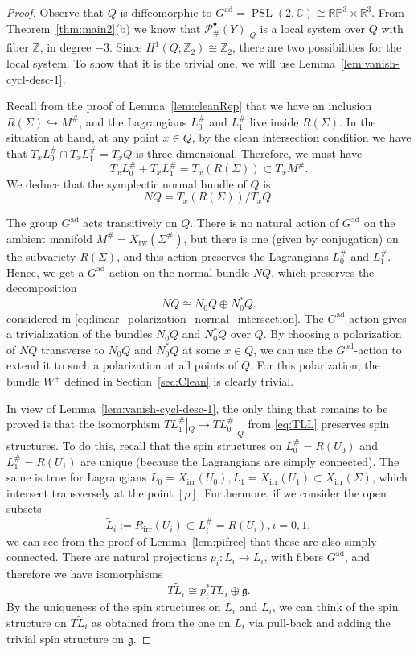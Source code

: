\documentclass [11pt]{amsart}
\theoremstyle{remark}
\def\zz {{\mathbb{Z}}}
\def\rr {{\mathbb{R}}}
\def\cc {{\mathbb{C}}}
\def\R{\rr}
\def\Z {\zz}
\def\rp {\mathbb{RP}}
\def\g{\mathfrak{g}}
\def\Gad{G^{\operatorname{ad}}}
\def\psl {{\operatorname{PSL}(2, \cc)}}
\def\Rep {R}
\def\RepIrr{R_{\operatorname{irr}}}
\def\Char {X}
\def\CharIrr {\Char_{\operatorname{irr}}}
\def\P {\mathcal{P}}
\def\Xtw{\Char_{\operatorname{tw}}}
\def\tL{\tilde{L}}
\begin{document}
\begin{proof}
Observe that $Q$ is diffeomorphic to $\Gad = \psl \cong \rp^3 \times \R^3$. From Theorem~\ref{thm:main2}(b) we know that $\P^{\bullet}_{\#}(Y)|_Q$ is a local system over $Q$ with fiber $\Z$, in degree $-3$. Since $H^1(Q; \Z_2) \cong \Z_2$, there are two possibilities for the local system. To show that it is the trivial one, we will use Lemma~\ref{lem:vanish-cycl-desc-1}.

Recall from the proof of Lemma~\ref{lem:cleanRep} that we have an inclusion $\Rep(\Sigma) \hookrightarrow  M^{\#}$, and the Lagrangians $L^{\#}_0$ and $L^{\#}_1$ live inside $\Rep(\Sigma)$. In the situation at hand, at any point $x \in Q$, by the clean intersection condition we have that $T_x L^{\#}_0 \cap T_xL^{\#}_1=T_xQ$ is three-dimensional. Therefore, we must have
$$T_x L^{\#}_0 + T_xL^{\#}_1= T_x (\Rep(\Sigma)) \subset T_xM^{\#}.$$
We deduce that the symplectic normal bundle of $Q$ is
$$NQ = T_x (\Rep(\Sigma))/T_xQ.$$
  
The group $\Gad$ acts transitively on $Q$. There is no natural action of $\Gad$ on the ambient manifold $M^{\#} = \Xtw(\Sigma^{\#})$, but there is one (given by conjugation) on the subvariety $\Rep(\Sigma)$, and this action preserves the Lagrangians $L^{\#}_0$ and $L^{\#}_1$. Hence, we get a $\Gad$-action on the normal bundle $NQ$, which preserves the decomposition
$$  NQ \cong N_0 Q \oplus N^*_0 Q.$$
considered in \eqref{eq:linear_polarization_normal_intersection}. The $\Gad$-action gives a trivialization of the bundles $N_0Q$ and $N^*_0Q$ over $Q$. By choosing a polarization of $NQ$ transverse to $N_0Q$ and $N^*_0Q$ at some $x \in Q$, we can use the $\Gad$-action to extend it to such a polarization at all points of $Q$. For this polarization, the bundle $W^+$ defined in Section~\ref{sec:Clean} is clearly trivial.

In view of Lemma~\ref{lem:vanish-cycl-desc-1}, the only thing that remains to be proved is that the isomorphism $TL^{\#}_1|_Q \to TL^{\#}_0|_Q$ from \eqref{eq:TLL} preserves spin structures. To do this, recall that the spin structures on $L^{\#}_0=\Rep(U_0)$ and $L^{\#}_1=\Rep(U_1)$ are unique (because the Lagrangians are simply connected). The same is true for Lagrangians  $L_0=\CharIrr(U_0), L_1=\CharIrr(U_1) \subset \CharIrr(\Sigma)$, which intersect transversely at the point $[\rho]$. Furthermore, if we consider the open subsets 
$$\tL_i := \RepIrr(U_i) \subset L^{\#}_i = \Rep(U_i),i=0,1,$$
we can see from the proof of Lemma~\ref{lem:pifree} that these are also simply connected. There are  natural projections $p_i : \tL_i \to L_i$, with fibers $\Gad$, and therefore we have isomorphisms
$$ T\tL_i \cong p_i^*TL_i \oplus \g.$$
By the uniqueness of the spin structures on $\tL_i$ and $L_i$, we can think of the spin structure on $T\tL_i$ as obtained from the one on $L_i$ via pull-back and adding the trivial spin structure on $\g$. 


\end{proof}
\end{document}
